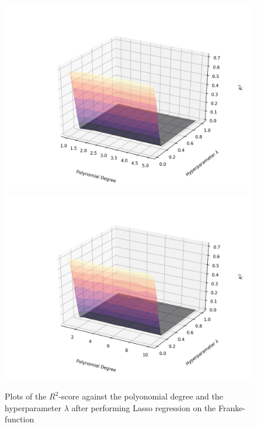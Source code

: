 \documentclass[a4paper,10pt,english]{article}
\begin{document}
\begin{figure}[H]
	\centering 
	\includegraphics[scale=0.47]{../franke_output/part_E_3.png}
	\includegraphics[scale=0.47]{../franke_output/part_E_3_highdeg.png}
	\caption{
		Plots of the $R^2$-score against the polyonomial degree and the hyperparameter $\lambda$ after performing Lasso regression on the Franke-function
	}
	\label{part_e3}
\end{figure}
\end{document}
